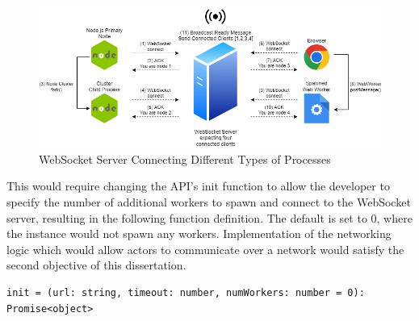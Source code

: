 \documentclass[12pt, a4paper]{report}
\theoremstyle{definition}
\theoremstyle{definition}%
\theoremstyle{definition}%
\theoremstyle{definition}%
\theoremstyle{definition}%
\theoremstyle{definition}%
\begin{document}
\begin{figure}[H]
    \begin{centering}
        \includegraphics[width=\textwidth]{resources/websocketconnectioncomplex.png}
        \caption{WebSocket Server Connecting Different Types of Processes}
    \end{centering}
\end{figure}

This would require changing the API’s init function to allow the developer to specify the number of additional workers to spawn and connect to the WebSocket server, resulting in the following function definition. The default is set to 0, where the instance would not spawn any workers. Implementation of the networking logic which would allow actors to communicate over a network would satisfy the second objective of this dissertation.
\begin{lstlisting}
init = (url: string, timeout: number, numWorkers: number = 0): Promise<object>
\end{lstlisting}
\end{document}

